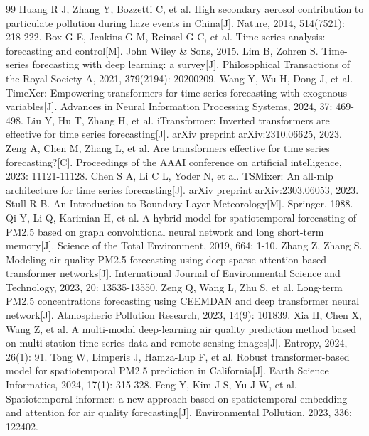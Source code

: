 \documentclass[12pt,a4paper]{article}
\begin{document}
\begin{thebibliography}{99}
 Huang R J, Zhang Y, Bozzetti C, et al. High secondary aerosol contribution to particulate pollution during haze events in China[J]. Nature, 2014, 514(7521): 218-222.
 Box G E, Jenkins G M, Reinsel G C, et al. Time series analysis: forecasting and control[M]. John Wiley \& Sons, 2015.
 Lim B, Zohren S. Time-series forecasting with deep learning: a survey[J]. Philosophical Transactions of the Royal Society A, 2021, 379(2194): 20200209.
 Wang Y, Wu H, Dong J, et al. TimeXer: Empowering transformers for time series forecasting with exogenous variables[J]. Advances in Neural Information Processing Systems, 2024, 37: 469-498.
 Liu Y, Hu T, Zhang H, et al. iTransformer: Inverted transformers are effective for time series forecasting[J]. arXiv preprint arXiv:2310.06625, 2023.
 Zeng A, Chen M, Zhang L, et al. Are transformers effective for time series forecasting?[C]. Proceedings of the AAAI conference on artificial intelligence, 2023: 11121-11128.
 Chen S A, Li C L, Yoder N, et al. TSMixer: An all-mlp architecture for time series forecasting[J]. arXiv preprint arXiv:2303.06053, 2023.
 Stull R B. An Introduction to Boundary Layer Meteorology[M]. Springer, 1988.
 Qi Y, Li Q, Karimian H, et al. A hybrid model for spatiotemporal forecasting of PM2.5 based on graph convolutional neural network and long short-term memory[J]. Science of the Total Environment, 2019, 664: 1-10.
 Zhang Z, Zhang S. Modeling air quality PM2.5 forecasting using deep sparse attention-based transformer networks[J]. International Journal of Environmental Science and Technology, 2023, 20: 13535-13550.
 Zeng Q, Wang L, Zhu S, et al. Long-term PM2.5 concentrations forecasting using CEEMDAN and deep transformer neural network[J]. Atmospheric Pollution Research, 2023, 14(9): 101839.
 Xia H, Chen X, Wang Z, et al. A multi-modal deep-learning air quality prediction method based on multi-station time-series data and remote-sensing images[J]. Entropy, 2024, 26(1): 91.
 Tong W, Limperis J, Hamza-Lup F, et al. Robust transformer-based model for spatiotemporal PM2.5 prediction in California[J]. Earth Science Informatics, 2024, 17(1): 315-328.
 Feng Y, Kim J S, Yu J W, et al. Spatiotemporal informer: a new approach based on spatiotemporal embedding and attention for air quality forecasting[J]. Environmental Pollution, 2023, 336: 122402.

\end{thebibliography}
\end{document}

